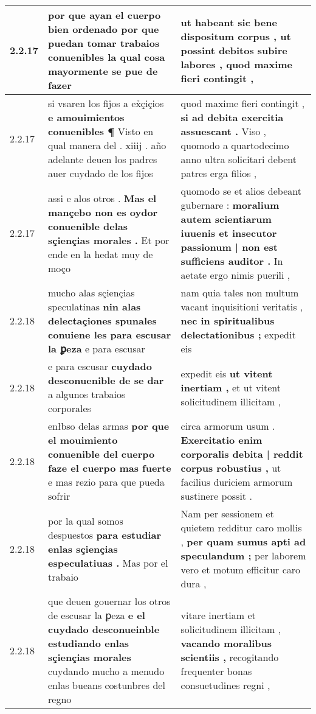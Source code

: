 \begin{tabular}{|p{1cm}|p{6.5cm}|p{6.5cm}|}
2.2.17 & por que ayan el cuerpo bien ordenado \textbf{ por que puedan tomar trabaios conuenibles la qual cosa } mayormente se pue de fazer & ut habeant sic bene dispositum corpus , \textbf{ ut possint debitos subire labores , } quod maxime fieri contingit , \\\hline
2.2.17 & si vsaren los fijos a ex̉çiçios \textbf{ e amouimientos conuenibles ¶ } Visto en qual manera del . xiiij . año adelante deuen los padres auer cuydado de los fijos & quod maxime fieri contingit , \textbf{ si ad debita exercitia assuescant . } Viso , quomodo a quartodecimo anno ultra solicitari debent patres erga filios , \\\hline
2.2.17 & assi e alos otros . \textbf{ Mas el mançebo non es oydor conuenible delas sçiençias morales . } Et por ende en la hedat muy de moço & quomodo se et alios debeant gubernare : \textbf{ moralium autem scientiarum iuuenis et insecutor passionum | non est sufficiens auditor . } In aetate ergo nimis puerili , \\\hline
2.2.18 & mucho alas sçiençias speculatinas \textbf{ nin alas delectaçiones spunales conuiene les para escusar la ꝑeza } e para escusar & nam quia tales non multum vacant inquisitioni veritatis , \textbf{ nec in spiritualibus delectationibus ; } expedit eis \\\hline
2.2.18 & e para escusar \textbf{ cuydado desconuenible de se dar } a algunos trabaios corporales & expedit eis \textbf{ ut vitent inertiam , } et ut vitent solicitudinem illicitam , \\\hline
2.2.18 & enłbso delas armas \textbf{ por que el mouimiento conuenible del cuerpo faze el cuerpo mas fuerte } e mas rezio para que pueda sofrir & circa armorum usum . \textbf{ Exercitatio enim corporalis debita | reddit corpus robustius , } ut facilius duriciem armorum sustinere possit . \\\hline
2.2.18 & por la qual somos despuestos \textbf{ para estudiar enlas sçiençias especulatiuas . } Mas por el trabaio & Nam per sessionem et quietem redditur caro mollis , \textbf{ per quam sumus apti ad speculandum ; } per laborem vero et motum efficitur caro dura , \\\hline
2.2.18 & que deuen gouernar los otros de escusar la ꝑeza \textbf{ e el cuydado desconueinble estudiando enlas sçiençias morales } cuydando mucho a menudo enlas bueans costunbres del regno & vitare inertiam et solicitudinem illicitam , \textbf{ vacando moralibus scientiis , } recogitando frequenter bonas consuetudines regni , \\\hline

\end{tabular}
